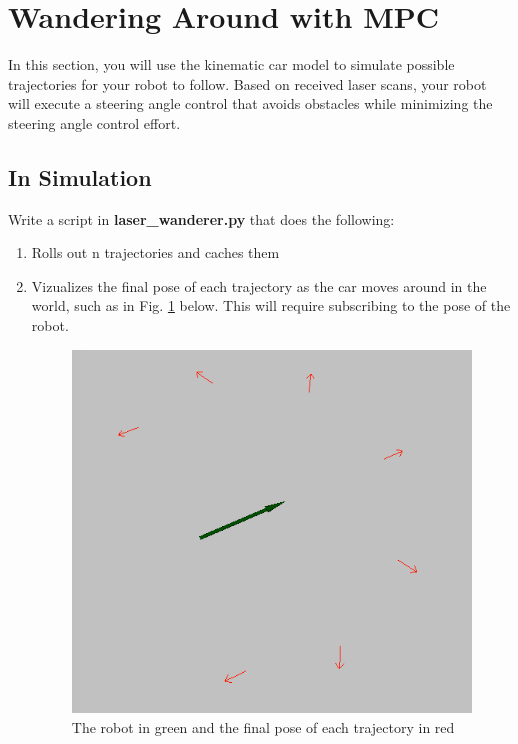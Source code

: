 \documentclass[final]{article}
\begin{document}
\section{Wandering Around with MPC}

In this section, you will use the kinematic car model to simulate possible trajectories for your robot to follow. Based on received laser scans, your robot will execute a steering angle control that avoids obstacles while minimizing the steering angle control effort.

\subsection{In Simulation}

Write a script in \textbf{laser\_wanderer.py} that does the following:
\begin{enumerate}
\item Rolls out n trajectories and caches them
\item Vizualizes the final pose of each trajectory as the car moves around in the world, such as in Fig. \ref{fig:rollouts} below. This will require subscribing to the pose of the robot.

\begin{figure}[h]
\centering
\includegraphics[width=0.45\linewidth]{figs/rollouts.png}
\caption{The robot in green and the final pose of each trajectory in red}
\label{fig:rollouts}
\end{figure}
 

\end{enumerate}
\end{document}
